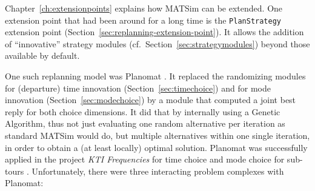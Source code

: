 Chapter~\ref{ch:extensionpoints} explains how MATSim can be extended.  One extension point that had been around for a long time is the \lstinline{PlanStrategy} extension point (Section~\ref{sec:replanning-extension-point}).  It allows the addition of ``innovative'' strategy modules (cf.\ Section~\ref{sec:strategymodules}) beyond those available by default.

One such replanning model was Planomat \citep[][]{MeisterEtAl_IATBR_2006, MeisterEtAl_STRC_2006, Meister_PhDThesis_2011}.  It replaced the randomizing modules  for (departure) time innovation (Section~\ref{sec:timechoice}) and for mode innovation (Section~\ref{sec:modechoice}) by a module that computed a joint best reply for both choice dimensions.  It did that by internally using a Genetic Algorithm, thus 
not just evaluating one random alternative per iteration as standard MATSim would do, but multiple alternatives within one single iteration, in order to obtain a (at least locally) optimal solution. 
Planomat was successfully applied in the 
project \emph{KTI Frequencies} for time choice and mode choice for sub-tours \citep[][p.10]{BalmerEtAl_ResRep_datapuls_2010}.
Unfortunately, there were three interacting problem complexes with Planomat:
